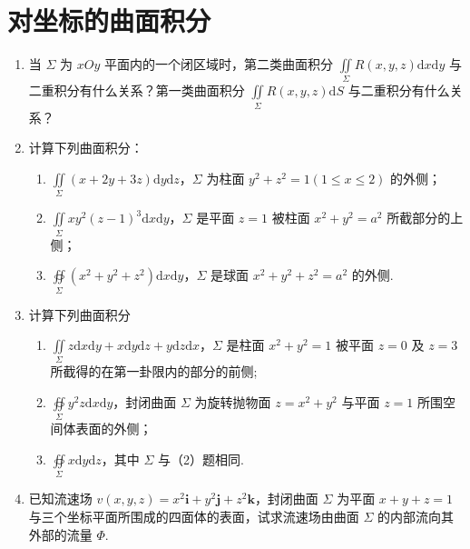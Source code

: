 \section{对坐标的曲面积分}

\begin{enumerate}\setlength{\itemsep}{7pt}
    \item 当 $\Sigma$ 为 $xOy$ 平面内的一个闭区域时，第二类曲面积分 $\displaystyle\iint\limits_{\Sigma}R(x, y, z)\text{d}x\text{d}y$ 与二重积分有什么关系？第一类曲面积分 $\displaystyle\iint\limits_{\Sigma}R(x, y, z)\text{d}S$ 与二重积分有什么关系？
    
    \item 计算下列曲面积分：
    \begin{enumerate}[(1)]\setlength{\itemsep}{5pt}\setlength{\topsep}{15pt}
        \item $\displaystyle\iint\limits_{\Sigma}(x+2y+3z)\text{d}y\text{d}z$，$\Sigma$ 为柱面 $y^2+z^2=1(1\leqslant x\leqslant2)$ 的外侧；
        \item $\displaystyle\iint\limits_{\Sigma}xy^2(z-1)^3\text{d}x\text{d}y$，$\Sigma$ 是平面 $z=1$ 被柱面 $x^2+y^2=a^2$ 所截部分的上侧；
        \item $\displaystyle\oiint\limits_{\Sigma}(x^2+y^2+z^2)\text{d}x\text{d}y$，$\Sigma$ 是球面 $x^2+y^2+z^2=a^2$ 的外侧.
    \end{enumerate}

    \item 计算下列曲面积分
    \begin{enumerate}[(1)]\setlength{\itemsep}{5pt}\setlength{\topsep}{15pt}
        \item $\displaystyle\iint\limits_{\Sigma}z\text{d}x\text{d}y+x\text{d}y\text{d}z+y\text{d}z\text{d}x$，$\Sigma$ 是柱面 $x^2+y^2=1$ 被平面 $z=0$ 及 $z=3$ 所截得的在第一卦限内的部分的前侧;
        \item $\displaystyle\oiint\limits_{\Sigma}y^2z\text{d}x\text{d}y$，封闭曲面 $\Sigma$ 为旋转抛物面 $z=x^2+y^2$ 与平面 $z=1$ 所围空间体表面的外侧；
        \item $\displaystyle\oiint\limits_{\Sigma}x\text{d}y\text{d}z$，其中 $\Sigma$ 与（2）题相同.
    \end{enumerate}

    \item 已知流速场 $v(x, y, z)=x^2\boldsymbol{i}+y^2\boldsymbol{j}+z^2\boldsymbol{k}$，封闭曲面 $\Sigma$ 为平面 $x+y+z=1$ 与三个坐标平面所围成的四面体的表面，试求流速场由曲面 $\Sigma$ 的内部流向其外部的流量 $\Phi$.
    

\end{enumerate}
